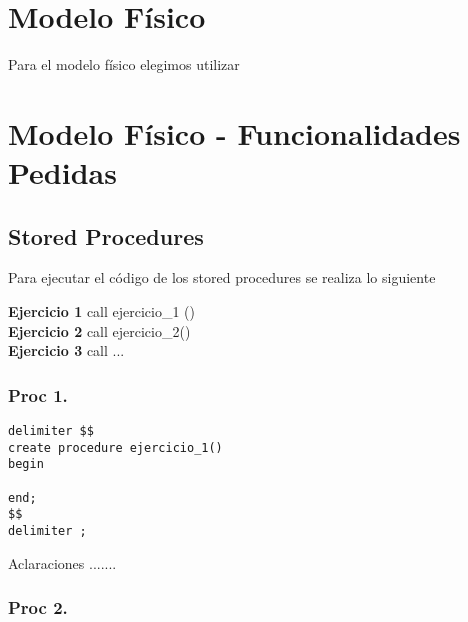 \section{Modelo F\'isico}

\noindent
Para el modelo f\'isico elegimos utilizar 

\section{Modelo F\'isico - Funcionalidades Pedidas}


\subsection{Stored Procedures}

\noindent
Para ejecutar el c\'odigo de los stored procedures se realiza lo siguiente

\vspace*{0.5cm}
\noindent
\textbf{Ejercicio 1} call ejercicio\_1 ()\\
\textbf{Ejercicio 2} call ejercicio\_2()\\
\textbf{Ejercicio 3} call ...

\newpage
\subsubsection{Proc 1.}

\begin{verbatim}
delimiter $$
create procedure ejercicio_1()
begin

end;
$$
delimiter ;
\end{verbatim}

\vspace*{0.5cm}
\noindent
Aclaraciones .......


\newpage
\subsubsection{Proc 2.}

